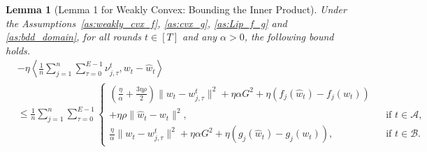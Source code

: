 \documentclass{article} %
\newtheorem{lemma}[]{Lemma}
\begin{document}
\begin{lemma}[Lemma 1 for Weakly Convex: Bounding the Inner Product]
    \label{lem:inner_prod_comp_wc}
    Under the Assumptions~\ref{as:weakly_cvx_f}, \ref{as:cvx_g}, \ref{as:Lip_f_g} and \ref{as:bdd_domain}, for all rounds $t\in[T]$ and any $\alpha > 0$, the following bound holds.
\[
\begin{aligned}
    &-\eta \left\langle  \frac{1}{n} \sum_{j=1}^n \sum_{\tau=0}^{E-1} \nu_{j,\tau}^t, w_t - \hat{w}_t \right\rangle \\
    &\leq \frac{1}{n} \sum_{j=1}^n \sum_{\tau=0}^{E-1}
    \left\{
    \begin{aligned}
    \left(\frac{\eta}{\alpha} +\frac{3\eta \rho}{2}\right)\| w_t - w_{j,\tau}^t \|^2 + \eta \alpha G^2 + \eta (f_j(\hat{w}_t) - f_j(w_t)) 
    \\
    + \eta\rho \|\hat{w}_t - w_t\|^2,
    && \text{if } t \in \mathcal{A}, \\
    \frac{\eta}{\alpha} \| w_t - w_{j,\tau}^t \|^2 + \eta \alpha G^2 + \eta (g_j(\hat{w}_t) - g_j(w_t)),
    && \text{if } t \in \mathcal{B}.
    \end{aligned}
    \right.
\end{aligned}
\]
\end{lemma}
\end{document}
